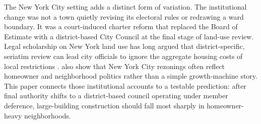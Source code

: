 The New York City setting adds a distinct form of variation.
The institutional change was not a town quietly revising its electoral rules or redrawing a ward boundary.
It was a court-induced charter reform that replaced the Board of Estimate with a district-based City Council at the final stage of land-use review.
Legal scholarship on New York land use has long argued that district-specific, seriatim review can lead city officials to ignore the aggregate housing costs of local restrictions \citep{hills_jr_balancing_2011,schleicher_city_2013}. \citet{been_urban_2014} also show that New York City rezonings often reflect homeowner and neighborhood politics rather than a simple growth-machine story.
This paper connects those institutional accounts to a testable prediction: after final authority shifts to a district-based council operating under member deference, large-building construction should fall most sharply in homeowner-heavy neighborhoods.

